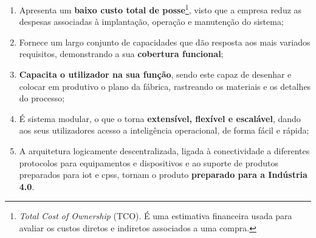 \begin{enumerate}
    \item 
    {
        Apresenta um \textbf{baixo custo total de posse}\footnote{\textit{Total Cost of Ownership} (TCO). É uma estimativa financeira usada para avaliar os custos diretos e indiretos associados a uma compra.}, visto que a empresa reduz as despesas associadas à implantação, operação e manutenção do sistema;
    }
    \item
    {
        Fornece um largo conjunto de capacidades que dão resposta aos mais variados requisitos, demonstrando a sua \textbf{cobertura funcional};
    }
    \item
    {
        \textbf{Capacita o utilizador na sua função}, sendo este capaz de desenhar e colocar em produtivo o plano da fábrica, rastreando os materiais e os detalhes do processo;
    }
    \item
    {
        É sistema modular, o que o torna \textbf{extensível, flexível e escalável}, dando aos seus utilizadores acesso a inteligência operacional, de forma fácil e rápida; 
    }
    \item
    {
        A arquitetura logicamente descentralizada, ligada à conectividade a diferentes protocolos para equipamentos e dispositivos e ao suporte de produtos preparados para \gls{iot} e \glspl{cps}, tornam o produto \textbf{preparado para a Indústria 4.0}.
    }
\end{enumerate}

